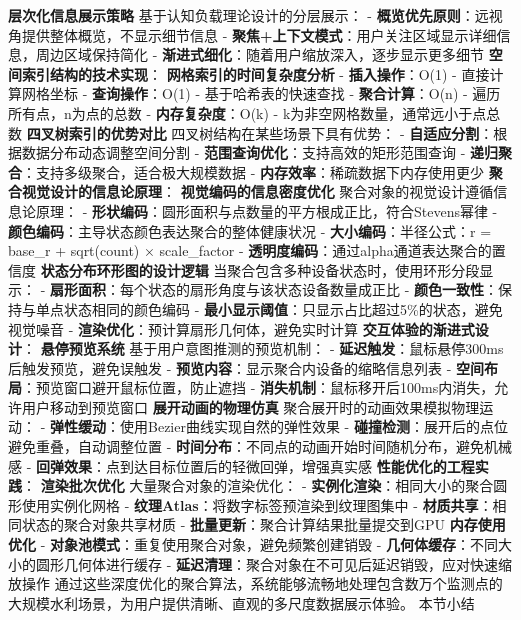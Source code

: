 {{{{\textbf{层次化信息展示策略} 基于认知负载理论设计的分层展示： - \textbf{概览优先原则}：远视角提供整体概览，不显示细节信息 - \textbf{聚焦+上下文模式}：用户关注区域显示详细信息，周边区域保持简化 -
\textbf{渐进式细化}：随着用户缩放深入，逐步显示更多细节 \textbf{空间索引结构的技术实现}： \textbf{网格索引的时间复杂度分析} - \textbf{插入操作}：O(1) - 直接计算网格坐标 -
\textbf{查询操作}：O(1) - 基于哈希表的快速查找 - \textbf{聚合计算}：O(n) - 遍历所有点，n为点的总数 - \textbf{内存复杂度}：O(k) - k为非空网格数量，通常远小于点总数
\textbf{四叉树索引的优势对比} 四叉树结构在某些场景下具有优势： - \textbf{自适应分割}：根据数据分布动态调整空间分割 - \textbf{范围查询优化}：支持高效的矩形范围查询 -
\textbf{递归聚合}：支持多级聚合，适合极大规模数据 - \textbf{内存效率}：稀疏数据下内存使用更少 \textbf{聚合视觉设计的信息论原理}： \textbf{视觉编码的信息密度优化} 聚合对象的视觉设计遵循信息论原理：
- \textbf{形状编码}：圆形面积与点数量的平方根成正比，符合Stevens幂律 - \textbf{颜色编码}：主导状态颜色表达聚合的整体健康状况 - \textbf{大小编码}：半径公式：r = base\_r +
sqrt(count) × scale\_factor - \textbf{透明度编码}：通过alpha通道表达聚合的置信度 \textbf{状态分布环形图的设计逻辑} 当聚合包含多种设备状态时，使用环形分段显示： -
\textbf{扇形面积}：每个状态的扇形角度与该状态设备数量成正比 - \textbf{颜色一致性}：保持与单点状态相同的颜色编码 - \textbf{最小显示阈值}：只显示占比超过5\%的状态，避免视觉噪音 -
\textbf{渲染优化}：预计算扇形几何体，避免实时计算 \textbf{交互体验的渐进式设计}： \textbf{悬停预览系统} 基于用户意图推测的预览机制： - \textbf{延迟触发}：鼠标悬停300ms后触发预览，避免误触发 -
\textbf{预览内容}：显示聚合内设备的缩略信息列表 - \textbf{空间布局}：预览窗口避开鼠标位置，防止遮挡 - \textbf{消失机制}：鼠标移开后100ms内消失，允许用户移动到预览窗口
\textbf{展开动画的物理仿真} 聚合展开时的动画效果模拟物理运动： - \textbf{弹性缓动}：使用Bezier曲线实现自然的弹性效果 - \textbf{碰撞检测}：展开后的点位避免重叠，自动调整位置 -
\textbf{时间分布}：不同点的动画开始时间随机分布，避免机械感 - \textbf{回弹效果}：点到达目标位置后的轻微回弹，增强真实感 \textbf{性能优化的工程实践}： \textbf{渲染批次优化} 大量聚合对象的渲染优化：
- \textbf{实例化渲染}：相同大小的聚合圆形使用实例化网格 - \textbf{纹理Atlas}：将数字标签预渲染到纹理图集中 - \textbf{材质共享}：相同状态的聚合对象共享材质 -
\textbf{批量更新}：聚合计算结果批量提交到GPU \textbf{内存使用优化} - \textbf{对象池模式}：重复使用聚合对象，避免频繁创建销毁 - \textbf{几何体缓存}：不同大小的圆形几何体进行缓存 -
\textbf{延迟清理}：聚合对象在不可见后延迟销毁，应对快速缩放操作 通过这些深度优化的聚合算法，系统能够流畅地处理包含数万个监测点的大规模水利场景，为用户提供清晰、直观的多尺度数据展示体验。 本节小结
}}}}
